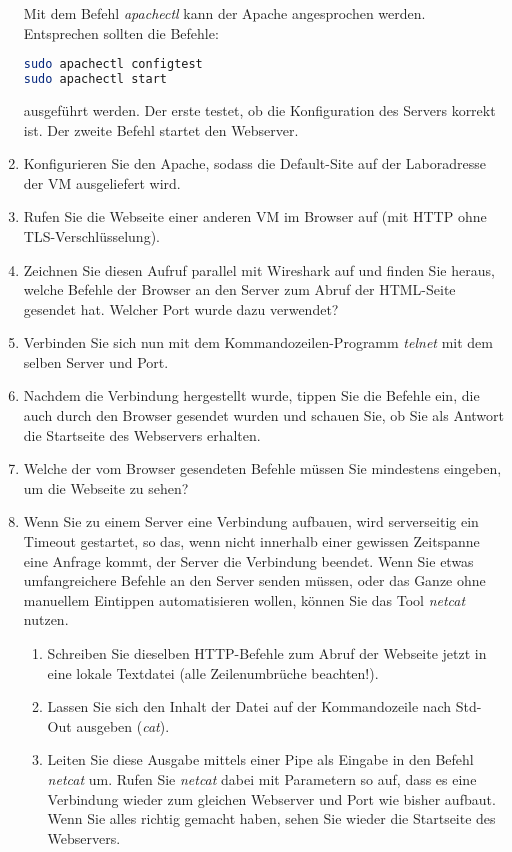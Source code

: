 \documentclass[paper=a4,fontsize=11pt]{scrartcl}%
\numberwithin{equation}{section}
\begin{document}
\begin{enumerate}
Mit dem Befehl \emph{apachectl} kann der Apache angesprochen werden. Entsprechen sollten die Befehle:
	\begin{lstlisting}[style=Bash, language=Bash]
sudo apachectl configtest
sudo apachectl start
\end{lstlisting}
	ausgeführt werden. Der erste testet, ob die Konfiguration des Servers korrekt ist. Der zweite Befehl startet den Webserver.
	\item Konfigurieren Sie den Apache, sodass die Default-Site auf der Laboradresse der VM ausgeliefert wird.
	\item Rufen Sie die Webseite einer anderen VM im Browser auf (mit HTTP ohne TLS-Verschlüsselung).
	\item Zeichnen Sie diesen Aufruf parallel mit Wireshark auf und finden Sie heraus, welche Befehle der Browser an den Server zum  Abruf der HTML-Seite gesendet hat. Welcher Port wurde dazu verwendet?
	\item Verbinden Sie sich nun mit dem Kommandozeilen-Programm \emph{telnet} mit dem selben Server und Port.
	\item Nachdem die Verbindung hergestellt wurde, tippen Sie die Befehle ein, die auch durch den Browser gesendet wurden und schauen Sie, ob Sie als Antwort die Startseite des Webservers erhalten.
	\item Welche der vom Browser gesendeten Befehle müssen Sie mindestens eingeben, um die Webseite zu sehen?
	\item Wenn Sie zu einem Server eine Verbindung aufbauen, wird serverseitig ein Timeout gestartet, so das, wenn nicht innerhalb einer gewissen Zeitspanne eine Anfrage kommt, der Server die Verbindung beendet. Wenn Sie etwas umfangreichere Befehle an den Server senden müssen, oder das Ganze ohne manuellem Eintippen automatisieren wollen, können Sie das Tool \emph{netcat} nutzen.
	\begin{enumerate}
		\item Schreiben Sie dieselben HTTP-Befehle zum Abruf der Webseite jetzt in eine lokale Textdatei (alle Zeilenumbrüche beachten!).
		\item Lassen Sie sich den Inhalt der Datei auf der Kommandozeile nach Std-Out ausgeben (\emph{cat}).
		\item Leiten Sie diese Ausgabe mittels einer Pipe als Eingabe in den Befehl \emph{netcat} um. Rufen Sie \emph{netcat} dabei mit  Parametern so auf, dass es eine Verbindung wieder zum gleichen Webserver und Port wie bisher aufbaut.\\
 Wenn Sie alles richtig gemacht haben, sehen Sie wieder die Startseite des Webservers.

\end{enumerate}
\end{enumerate}
\end{document}
